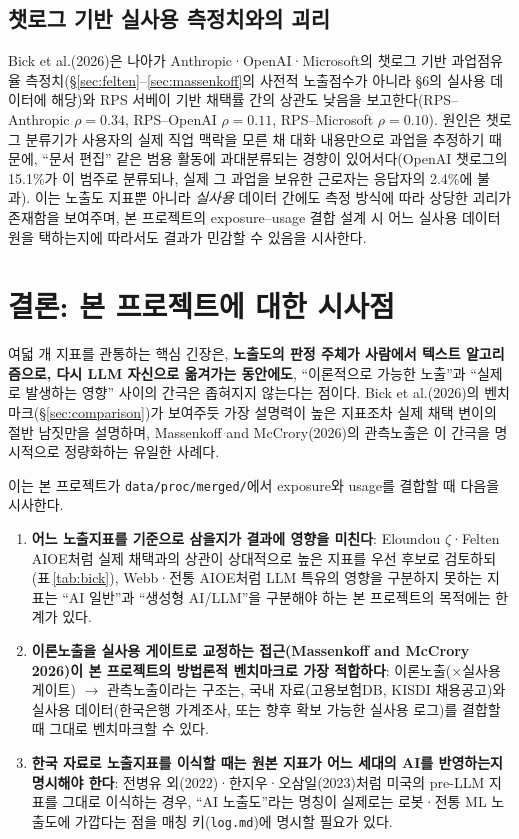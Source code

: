 \documentclass[11pt]{article}
\begin{document}
\subsection{챗로그 기반 실사용 측정치와의 괴리}

Bick et al.(2026)은 나아가 Anthropic·OpenAI·Microsoft의 챗로그 기반 과업점유율 측정치(\S\ref{sec:felten}--\ref{sec:massenkoff}의 사전적 노출점수가 아니라 \S6의 실사용 데이터에 해당)와 RPS 서베이 기반 채택률 간의 상관도 낮음을 보고한다(RPS--Anthropic $\rho=0.34$, RPS--OpenAI $\rho=0.11$, RPS--Microsoft $\rho=0.10$). 원인은 챗로그 분류기가 사용자의 실제 직업 맥락을 모른 채 대화 내용만으로 과업을 추정하기 때문에, ``문서 편집'' 같은 범용 활동에 과대분류되는 경향이 있어서다(OpenAI 챗로그의 15.1\%가 이 범주로 분류되나, 실제 그 과업을 보유한 근로자는 응답자의 2.4\%에 불과). 이는 노출도 지표뿐 아니라 \emph{실사용} 데이터 간에도 측정 방식에 따라 상당한 괴리가 존재함을 보여주며, 본 프로젝트의 exposure--usage 결합 설계 시 어느 실사용 데이터원을 택하는지에 따라서도 결과가 민감할 수 있음을 시사한다.

\section{결론: 본 프로젝트에 대한 시사점}

여덟 개 지표를 관통하는 핵심 긴장은, \textbf{노출도의 판정 주체가 사람에서 텍스트 알고리즘으로, 다시 LLM 자신으로 옮겨가는 동안에도}, ``이론적으로 가능한 노출''과 ``실제로 발생하는 영향'' 사이의 간극은 좁혀지지 않는다는 점이다. Bick et al.(2026)의 벤치마크(\S\ref{sec:comparison})가 보여주듯 가장 설명력이 높은 지표조차 실제 채택 변이의 절반 남짓만을 설명하며, Massenkoff and McCrory(2026)의 관측노출은 이 간극을 명시적으로 정량화하는 유일한 사례다.

이는 본 프로젝트가 \texttt{data/proc/merged/}에서 exposure와 usage를 결합할 때 다음을 시사한다.

\begin{enumerate}[label=(\arabic*)]
  \item \textbf{어느 노출지표를 기준으로 삼을지가 결과에 영향을 미친다}: Eloundou $\zeta$·Felten AIOE처럼 실제 채택과의 상관이 상대적으로 높은 지표를 우선 후보로 검토하되(표\,\ref{tab:bick}), Webb·전통 AIOE처럼 LLM 특유의 영향을 구분하지 못하는 지표는 ``AI 일반''과 ``생성형 AI/LLM''을 구분해야 하는 본 프로젝트의 목적에는 한계가 있다.
  \item \textbf{이론노출을 실사용 게이트로 교정하는 접근(Massenkoff and McCrory 2026)이 본 프로젝트의 방법론적 벤치마크로 가장 적합하다}: 이론노출($\times$실사용 게이트) $\to$ 관측노출이라는 구조는, 국내 자료(고용보험DB, KISDI 채용공고)와 실사용 데이터(한국은행 가계조사, 또는 향후 확보 가능한 실사용 로그)를 결합할 때 그대로 벤치마크할 수 있다.
  \item \textbf{한국 자료로 노출지표를 이식할 때는 원본 지표가 어느 세대의 AI를 반영하는지 명시해야 한다}: 전병유 외(2022)·한지우·오삼일(2023)처럼 미국의 pre-LLM 지표를 그대로 이식하는 경우, ``AI 노출도''라는 명칭이 실제로는 로봇·전통 ML 노출도에 가깝다는 점을 매칭 키(\texttt{log.md})에 명시할 필요가 있다.
\end{enumerate}

\clearpage
\printbibliography
\end{document}
